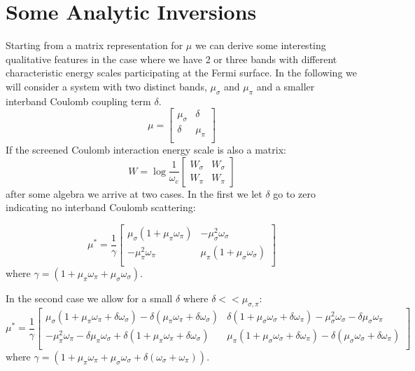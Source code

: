 \documentclass{article}
\begin{document}
\section{Some Analytic Inversions}
%
Starting from a matrix representation for 
$\mu$ we can derive some interesting qualitative features in the case 
where we have 2 or three bands with different characteristic energy 
scales participating at the Fermi surface. In the following we will
consider a system with two distinct bands, $\mu_{\sigma}$ and $\mu_{\pi}$ and a smaller interband
Coulomb coupling term $\delta$.
%
\begin{equation}
\mu = 
\begin{bmatrix}
\mu_{\sigma} & \delta \\
\delta & \mu_{\pi}\\
\end{bmatrix}
\end{equation}
%
If the screened Coulomb interaction energy scale is also a matrix:
%
\begin{equation}
W = \log \frac{1}{\omega_{c}}
\begin{bmatrix}
W_{\sigma} & W_{\sigma} \\
W_{\pi} & W_{\pi}
\end{bmatrix}
\end{equation}
%
after some algebra we arrive at two cases. In the first we let $\delta$
go to zero indicating no interband Coulomb scattering:

\begin{equation}
\mu^{*} = \frac{1}{\gamma}
\begin{bmatrix}
\mu_{\sigma}(1 + \mu_{\pi}\omega_{\pi}) &  -\mu_{\sigma}^{2}\omega_{\sigma}        \\
      -\mu_{\pi}^{2}\omega_{\pi}     & \mu_{\pi}(1+ \mu_{\sigma}\omega_{\sigma}) \\
\end{bmatrix}
\end{equation}
%
where $\gamma=(1+ \mu_{\pi}\omega_{\pi} + \mu_{\sigma}\omega_{\sigma})$.

In the second case we allow for a small $\delta$ where $\delta<<\mu_{\sigma,\pi}$:
%
\begin{equation}
\mu^{*} = \frac{1}{\gamma}
\begin{bmatrix}
\mu_{\sigma}(1 + \mu_{\pi}\omega_{\pi} + \delta \omega_{\sigma}) - \delta(\mu_{\pi}\omega_{\pi} + \delta\omega_{\sigma}) 
& \delta(1+\mu_{\sigma}\omega_{\sigma}+\delta\omega_{\pi}) - \mu_{\sigma}^{2}\omega_{\sigma}-\delta\mu_{\sigma}\omega_{\pi} \\
-\mu_{\pi}^{2}\omega_{\pi}-\delta\mu_{\pi}\omega_{\sigma} +\delta(1+\mu_{\pi}\omega_{\pi}+\delta\omega_{\sigma})  & \mu_{\pi}(1+ \mu_{\sigma}\omega_{\sigma} + \delta\omega_{\pi})
-\delta(\mu_{\sigma}\omega_{\sigma}+\delta\omega_{\pi}) \\
\end{bmatrix}
\end{equation}
%
where $\gamma=(1+\mu_{\pi}\omega_{\pi}+\mu_{\sigma}\omega_{\sigma}+\delta(\omega_{\sigma}+\omega_{\pi}))$.


\scriptsize

\end{document}
